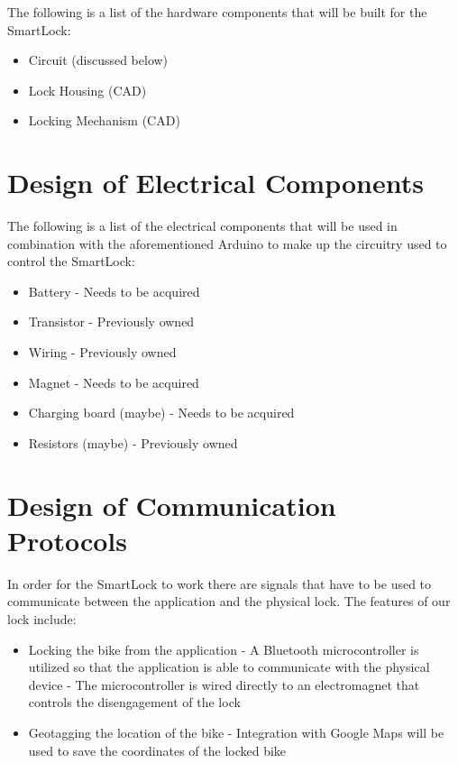\documentclass[12pt, titlepage]{article}
\begin{document}
The following is a list of the hardware components that will be built for the SmartLock:
\begin{itemize}
\item Circuit (discussed below)
\item Lock Housing (CAD)
\item Locking Mechanism (CAD)
\end{itemize}


\section{Design of Electrical Components}

The following is a list of the electrical components that will be used in combination with the aforementioned Arduino to make up the circuitry used to control the SmartLock:
\begin{itemize}
\item Battery
\subitem - Needs to be acquired
\item Transistor
\subitem - Previously owned
\item Wiring
\subitem - Previously owned
\item Magnet
\subitem - Needs to be acquired
\item Charging board (maybe)
\subitem - Needs to be acquired
\item Resistors (maybe)
\subitem - Previously owned
\end{itemize}



\section{Design of Communication Protocols}

In order for the SmartLock to work there are signals that have to be used to communicate between the application and the physical lock. 
The features of our lock include: 
\begin{itemize}
\item Locking the bike from the application
\subitem - A Bluetooth microcontroller is utilized so that the application is able to communicate with the physical device
\subitem - The microcontroller is wired directly to an electromagnet that controls the disengagement of the lock
\item Geotagging the location of the bike
\subitem - Integration with Google Maps will be used to save the coordinates of the locked bike
\end{itemize}
\end{document}

